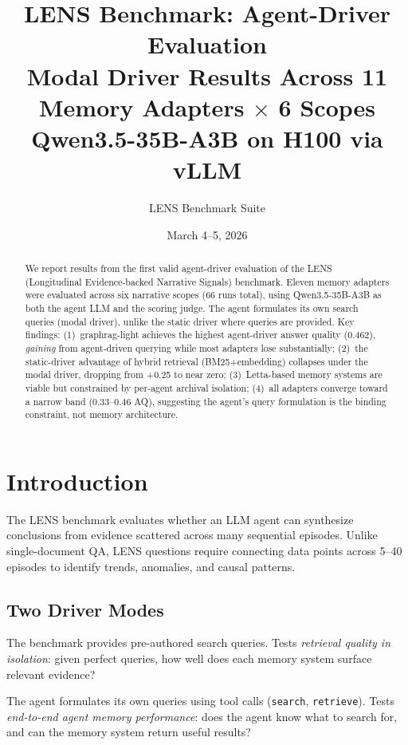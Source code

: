 \documentclass[11pt,a4paper]{article}
\title{%
  \textbf{LENS Benchmark: Agent-Driver Evaluation} \\[0.5em]
  \large Modal Driver Results Across 11 Memory Adapters $\times$ 6 Scopes \\[0.3em]
  \normalsize Qwen3.5-35B-A3B on H100 via vLLM
}
\author{LENS Benchmark Suite}
\date{March 4--5, 2026}
\begin{document}
\maketitle

\begin{abstract}
We report results from the first valid agent-driver evaluation of the LENS (Longitudinal Evidence-backed Narrative Signals) benchmark.
Eleven memory adapters were evaluated across six narrative scopes (66 runs total), using Qwen3.5-35B-A3B as both the agent LLM and the scoring judge.
The agent formulates its own search queries (modal driver), unlike the static driver where queries are provided.
Key findings: (1)~graphrag-light achieves the highest agent-driver answer quality (0.462), \emph{gaining} from agent-driven querying while most adapters lose substantially;
(2)~the static-driver advantage of hybrid retrieval (BM25+embedding) collapses under the modal driver, dropping from +0.25 to near zero;
(3)~Letta-based memory systems are viable but constrained by per-agent archival isolation;
(4)~all adapters converge toward a narrow band (0.33--0.46 AQ), suggesting the agent's query formulation is the binding constraint, not memory architecture.
\end{abstract}

\tableofcontents
\newpage

\section{Introduction}

The LENS benchmark evaluates whether an LLM agent can synthesize conclusions from evidence scattered across many sequential episodes.
Unlike single-document QA, LENS questions require connecting data points across 5--40 episodes to identify trends, anomalies, and causal patterns.

\subsection{Two Driver Modes}

\begin{description}[leftmargin=1.5cm]
  \item[Static driver] The benchmark provides pre-authored search queries.
    Tests \emph{retrieval quality in isolation}: given perfect queries, how well does each memory system surface relevant evidence?
  \item[Modal driver] The agent formulates its own queries using tool calls (\texttt{search}, \texttt{retrieve}).
    Tests \emph{end-to-end agent memory performance}: does the agent know what to search for, and can the memory system return useful results?
\end{description}
\end{document}
